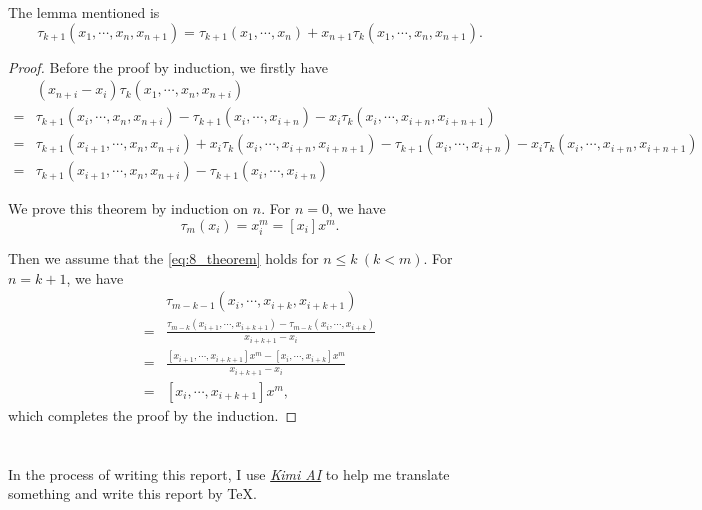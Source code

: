 \documentclass[a4paper]{article}
\begin{document}
The lemma mentioned is 
\begin{equation}
  \tau_{k + 1}(x_1, \cdots, x_n, x_{n + 1}) = \tau_{k + 1}(x_1, \cdots, x_n) + x_{n + 1}\tau_k(x_1, \cdots, x_n, x_{n + 1}).
  \label{eq:8_lemma}
\end{equation}

\begin{proof}

  Before the proof by induction, we firstly have
  \begin{equation}
    \begin{aligned}
      & (x_{n + i} - x_i)\tau_{k}(x_1, \cdots, x_n, x_{n + i}) \\
      =& \tau_{k + 1}(x_i, \cdots, x_n, x_{n + i}) - \tau_{k + 1}(x_i, \cdots, x_{i + n}) - x_i\tau_{k}(x_i, \cdots, x_{i + n}, x_{i + n + 1}) \\
      =& \tau_{k + 1}(x_{i + 1}, \cdots, x_n, x_{n + i}) + x_i \tau_k(x_i, \cdots, x_{i + n}, x_{i + n + 1}) - \tau_{k + 1}(x_i, \cdots, x_{i + n}) - x_i\tau_{k}(x_i, \cdots, x_{i + n}, x_{i + n + 1}) \\
      =& \tau_{k + 1}(x_{i + 1}, \cdots, x_n, x_{n + i}) - \tau_{k + 1}(x_i, \cdots, x_{i + n})
    \end{aligned}
    \label{eq:8_lemma_1}
  \end{equation}

  We prove this theorem by induction on $n$. For $n = 0$, we have
  \begin{equation}
    \tau_m(x_i) = x_i^m = [x_i]x^m.
    \label{eq:8_induction_base}
  \end{equation}
  
  Then we assume that the \cref{eq:8_theorem} holds for $n \leqslant k \ (k < m)$. For $n = k + 1$, we have
  \begin{equation}
    \begin{aligned}
      & \tau_{m - k - 1}(x_i, \cdots, x_{i + k}, x_{i + k + 1})   \\
      =& \frac{\tau_{m - k}(x_{i + 1}, \cdots, x_{i + k + 1}) - \tau_{m - k}(x_i, \cdots, x_{i + k})}{x_{i + k + 1} - x_i} \\
      =& \frac{[x_{i + 1}, \cdots, x_{i + k + 1}]x^m - [x_i, \cdots, x_{i + k}]x^m}{x_{i + k + 1} - x_i} \\
      =& [x_i, \cdots, x_{i + k + 1}]x^m,
    \end{aligned}
    \label{eq:8_lemma_2}
  \end{equation}
  which completes the proof by the induction.
\end{proof}

\section*{  }

In the process of writing this report, I use \href{https://kimi.moonshot.cn/}{\textit{Kimi AI}} to help me translate something and write this report by \TeX.

\end{document}
